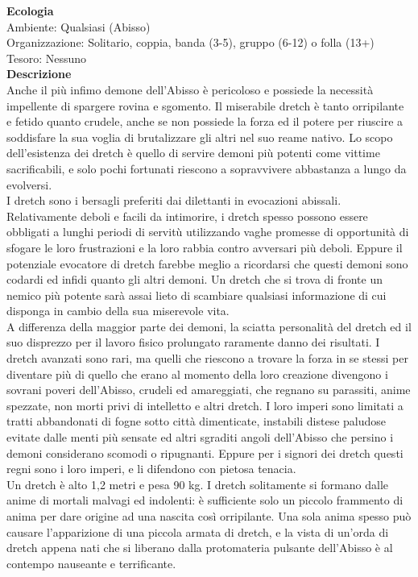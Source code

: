 \begin{multicols}{2}
\textbf{Ecologia}\\
Ambiente: Qualsiasi (Abisso)\\
Organizzazione: Solitario, coppia, banda (3-5), gruppo (6-12) o folla (13+)\\
Tesoro: Nessuno\\
\textbf{Descrizione}\\
Anche il più infimo demone dell'Abisso è pericoloso e possiede la necessità impellente di spargere rovina e sgomento. Il miserabile dretch è tanto orripilante e fetido quanto crudele, anche se non possiede la forza ed il potere per riuscire a soddisfare la sua voglia di brutalizzare gli altri nel suo reame nativo. Lo scopo dell'esistenza dei dretch è quello di servire demoni più potenti come vittime sacrificabili, e solo pochi fortunati riescono a sopravvivere abbastanza a lungo da evolversi.\\
I dretch sono i bersagli preferiti dai dilettanti in evocazioni abissali. Relativamente deboli e facili da intimorire, i dretch spesso possono essere obbligati a lunghi periodi di servitù utilizzando vaghe promesse di opportunità di sfogare le loro frustrazioni e la loro rabbia contro avversari più deboli. Eppure il potenziale evocatore di dretch farebbe meglio a ricordarsi che questi demoni sono codardi ed infidi quanto gli altri demoni. Un dretch che si trova di fronte un nemico più potente sarà assai lieto di scambiare qualsiasi informazione di cui disponga in cambio della sua miserevole vita.\\
A differenza della maggior parte dei demoni, la sciatta personalità del dretch ed il suo disprezzo per il lavoro fisico prolungato raramente danno dei risultati. I dretch avanzati sono rari, ma quelli che riescono a trovare la forza in se stessi per diventare più di quello che erano al momento della loro creazione divengono i sovrani poveri dell'Abisso, crudeli ed amareggiati, che regnano su parassiti, anime spezzate, non morti privi di intelletto e altri dretch. I loro imperi sono limitati a tratti abbandonati di fogne sotto città dimenticate, instabili distese paludose evitate dalle menti più sensate ed altri sgraditi angoli dell'Abisso che persino i demoni considerano scomodi o ripugnanti. Eppure per i signori dei dretch questi regni sono i loro imperi, e li difendono con pietosa tenacia.\\
Un dretch è alto 1,2 metri e pesa 90 kg. I dretch solitamente si formano dalle anime di mortali malvagi ed indolenti: è sufficiente solo un piccolo frammento di anima per dare origine ad una nascita così orripilante. Una sola anima spesso può causare l'apparizione di una piccola armata di dretch, e la vista di un'orda di dretch appena nati che si liberano dalla protomateria pulsante dell'Abisso è al contempo nauseante e terrificante.\\



\end{multicols}
